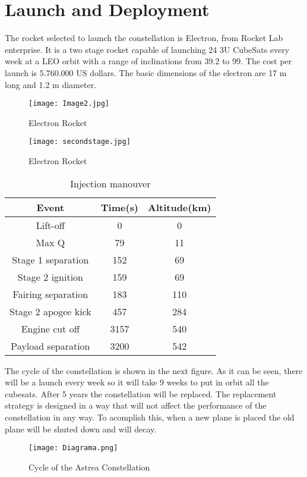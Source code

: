 \chapter{Launch and Deployment}
The rocket selected to launch the constellation is Electron, from Rocket Lab enterprise.    It is a two stage rocket capable of launching 24 3U CubeSats every week at a LEO orbit with a range of inclinations from 39.2 to 99. The cost per launch is 5.760.000 US dollars. The basic dimensions of the electron are 17 m long and 1.2 m diameter.   
\begin{figure}[H]
\begin{center}
\texttt{[image: Image2.jpg]} 
\caption{Electron Rocket}
\end{center}
\end{figure}
\begin{figure}[H]
\begin{center}
\texttt{[image: secondstage.jpg]} 
\caption{Electron Rocket}
\end{center}
\end{figure}
\begin{table}[H]
\begin{center}
\begin{tabular}{|c|c|c|}
\hline
\rowcolor[gray]{0.80}\textbf{Event}&\textbf{Time(s)}&\textbf{Altitude(km)}\\
\hline
Lift-off&0&0\\
\hline
Max Q&79&11\\
\hline
Stage 1 separation&152&69\\
\hline
Stage 2 ignition&159&69\\
\hline
Fairing separation&183&110\\
\hline
Stage 2 apogee kick&457&284\\
\hline
Engine cut off&3157&540\\
\hline
Payload separation&3200&542\\
\hline
\end{tabular}
\caption{Injection manouver}
\end{center}
\end{table}
The cycle of the constellation is shown in the next figure. As it can be seen, there will be a launch every week so it will take 9 weeks to put in orbit all the cubesats. After 5 years the constellation will be replaced. The replacement strategy is designed in a way that will not affect the performance of the constellation in any way. To acomplish this, when a new plane is placed the old plane will be shuted down and will decay.    
\begin{figure}[H]
\begin{center}
\texttt{[image: Diagrama.png]} 
\caption{Cycle of the Astrea Constellation}
\end{center}
\end{figure}


